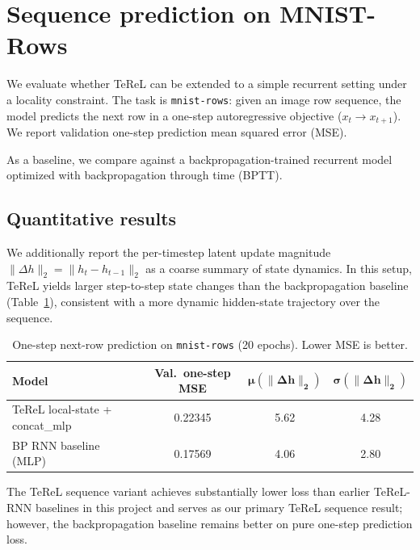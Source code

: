 
\section{Sequence prediction on MNIST-Rows}\label{sec:mnist_rows_rnn}

We evaluate whether TeReL can be extended to a simple recurrent setting under a locality constraint. The task is \texttt{mnist-rows}: given an image row sequence, the model predicts the next row in a one-step autoregressive objective ($x_t \rightarrow x_{t+1}$). We report validation one-step prediction mean squared error (MSE).

As a baseline, we compare against a backpropagation-trained recurrent model optimized with backpropagation through time (BPTT).

\subsection{Quantitative results}
We additionally report the per-timestep latent update magnitude $\lVert \Delta h \rVert_2 = \lVert h_t - h_{t-1} \rVert_2$ as a coarse summary of state dynamics. In this setup, TeReL yields larger step-to-step state changes than the backpropagation baseline (Table~\ref{tab:mnist_rows_one_step}), consistent with a more dynamic hidden-state trajectory over the sequence.

\begin{table}[h!]
  \centering
  \caption{One-step next-row prediction on \texttt{mnist-rows} (20 epochs). Lower MSE is better.}
  \begin{tabular}{lccc}
    \toprule
    \textbf{Model} & \textbf{Val.\ one-step MSE} & $\mathbf{\mu(\lVert \Delta h \rVert_2)}$ & $\mathbf{\sigma(\lVert \Delta h \rVert_2)}$ \\
    \midrule
    TeReL local-state + concat\_mlp & 0.22345 & 5.62 & 4.28 \\
    BP RNN baseline (MLP)        & 0.17569 & 4.06 & 2.80 \\
    \bottomrule
  \end{tabular}
  \label{tab:mnist_rows_one_step}
\end{table}

The TeReL sequence variant achieves substantially lower loss than earlier TeReL-RNN baselines in this project and serves as our primary TeReL sequence result; however, the backpropagation baseline remains better on pure one-step prediction loss.

